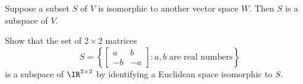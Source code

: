 \begin{applicationActivities}{4}{10}
\begin{fact}
  Suppose a subset \(S\) of \(V\) is isomorphic to another vector space
  \(W\).
  Then \(S\) is a subspace of \(V\).
\end{fact}

\begin{activity}{5}
  Show that the set of \(2\times 2\) matrices
  \[S=
    \left\{
    \begin{bmatrix}a&b\\-b&-a\end{bmatrix} :
    a,b\text{ are real numbers}
    \right\}
  \]
  is a subspace of \(\IR^{2\times 2}\) by identifying a Euclidean
  space isomorphic to \(S\).
\end{activity}



\end{applicationActivities}
